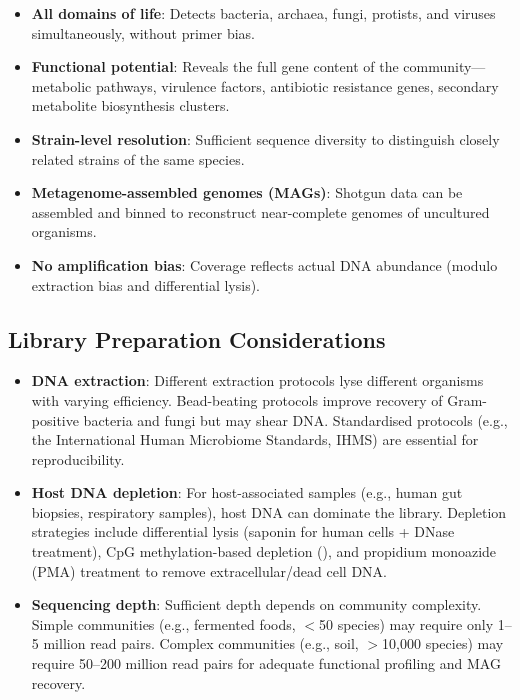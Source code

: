 \begin{itemize}[nosep]
  \item \textbf{All domains of life}: Detects bacteria, archaea, fungi, protists, and viruses simultaneously, without primer bias.
  \item \textbf{Functional potential}: Reveals the full gene content of the community---metabolic pathways, virulence factors, antibiotic resistance genes, secondary metabolite biosynthesis clusters.
  \item \textbf{Strain-level resolution}: Sufficient sequence diversity to distinguish closely related strains of the same species.
  \item \textbf{Metagenome-assembled genomes (MAGs)}: Shotgun data can be assembled and binned to reconstruct near-complete genomes of uncultured organisms.
  \item \textbf{No amplification bias}: Coverage reflects actual DNA abundance (modulo extraction bias and differential lysis).
\end{itemize}

\subsection{Library Preparation Considerations}

\begin{itemize}[nosep]
  \item \textbf{DNA extraction}: Different extraction protocols lyse different organisms with varying efficiency. Bead-beating protocols improve recovery of Gram-positive bacteria and fungi but may shear DNA. Standardised protocols (e.g., the International Human Microbiome Standards, IHMS) are essential for reproducibility.
  \item \textbf{Host DNA depletion}: For host-associated samples (e.g., human gut biopsies, respiratory samples), host DNA can dominate the library. Depletion strategies include differential lysis (saponin for human cells + DNase treatment), CpG methylation-based depletion (), and propidium monoazide (PMA) treatment to remove extracellular/dead cell DNA.
  \item \textbf{Sequencing depth}: Sufficient depth depends on community complexity. Simple communities (e.g., fermented foods, $<$50 species) may require only 1--5 million read pairs. Complex communities (e.g., soil, $>$10,000 species) may require 50--200 million read pairs for adequate functional profiling and MAG recovery.
\end{itemize}

